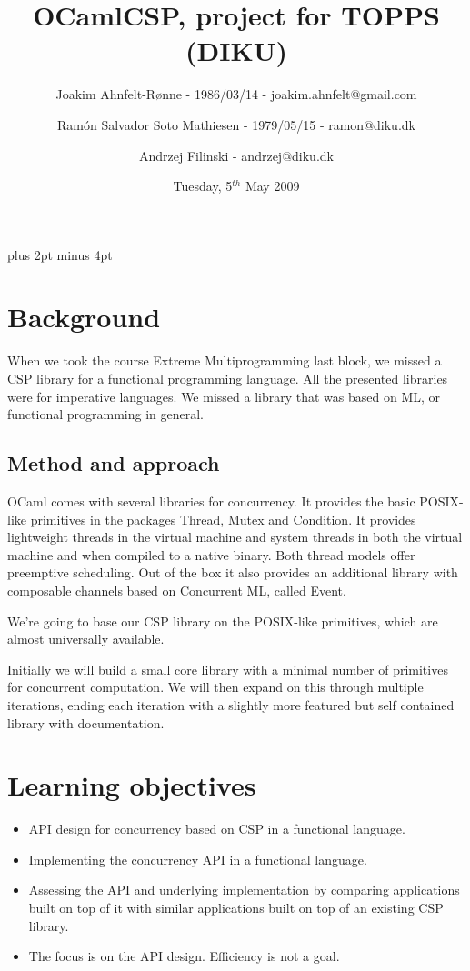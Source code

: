 \documentclass[a4paper,12pt]{article}
\title{OCamlCSP, project for TOPPS (DIKU)}
\author{Joakim Ahnfelt-Rønne - 1986/03/14 - joakim.ahnfelt@gmail.com \and 
        Ramón Salvador Soto Mathiesen - 1979/05/15 - ramon@diku.dk \and
        Andrzej Filinski - andrzej@diku.dk}
\date{Tuesday, 5$^{th}$ May 2009}
\begin{document}
\parindent=0pt
\parskip=8pt plus 2pt minus 4pt

\maketitle
\newpage

\section*{Background}
When we took the course Extreme Multiprogramming last block, we missed 
a CSP\cite{hoare} library for a functional programming language. All the 
presented libraries were for imperative languages. We missed a library that 
was based on ML, or functional programming in general.

\subsection*{Method and approach}
OCaml comes with several libraries for concurrency.
It provides the basic POSIX-like primitives in the packages Thread,
Mutex and Condition. It provides lightweight threads in the virtual
machine and system threads in both the virtual machine and when
compiled to a native binary. Both thread models offer preemptive
scheduling. Out of the box it also provides an additional library 
with composable channels based on Concurrent ML, called Event. 

We're going to base our CSP library on the POSIX-like primitives,
which are almost universally available.

Initially we will build a small core library with a minimal number
of primitives for concurrent computation. We will then expand on this
through multiple iterations, ending each iteration with a slightly
more featured but self contained library with documentation.


\section*{Learning objectives} %
\begin{itemize}
 \item API design for concurrency based on CSP in a functional language.
 \item Implementing the concurrency API in a functional language.
 \item Assessing the API and underlying implementation by comparing
   applications built on top of it with similar applications built on
   top of an existing CSP library.
 \item The focus is on the API design. Efficiency is not a goal.
\end{itemize}
\end{document}
